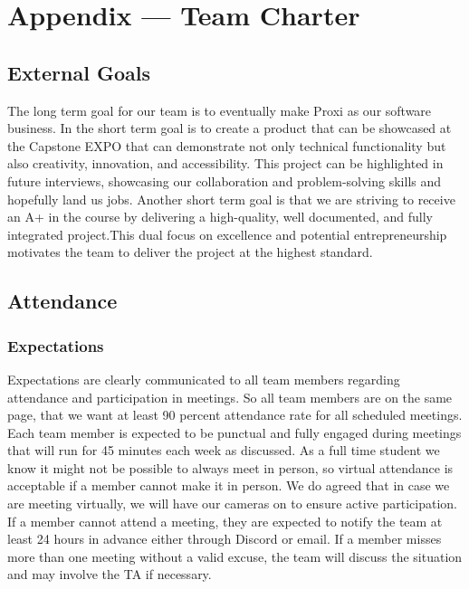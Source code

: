 \documentclass{article}
\begin{document}
\section*{Appendix --- Team Charter}


\subsection*{External Goals}

The long term goal for our team is to eventually make Proxi as our software business. In the short term goal is to create 
a product that can be showcased at the Capstone EXPO that can demonstrate not only technical functionality but also creativity, 
innovation, and accessibility. This project can be highlighted in future interviews, showcasing our collaboration and problem-solving 
skills and hopefully land us jobs. Another short term goal is that we are striving to receive an A+ in the course by delivering a high-quality, 
well documented, and fully integrated project.This dual focus on excellence and potential entrepreneurship motivates the team to deliver the 
project at the highest standard.

\subsection*{Attendance}

\subsubsection*{Expectations}

Expectations are clearly communicated to all team members regarding attendance and participation in meetings. So all team members are on the same page,
that we want at least 90 percent attendance rate for all scheduled meetings. Each team member is expected to be punctual and fully engaged during meetings that 
will run for 45 minutes each week as discussed. As a full time student we know it might not be possible to always meet in person, so virtual attendance is acceptable 
if a member cannot make it in person. We do agreed that in case we are meeting virtually, we will have our cameras on to ensure active participation. 
If a member cannot attend a meeting, they are expected to notify the team at least 24 hours in advance either through Discord or email. If a member misses 
more than one meeting without a valid excuse, the team will discuss the situation and may involve the TA if necessary.
\end{document}
